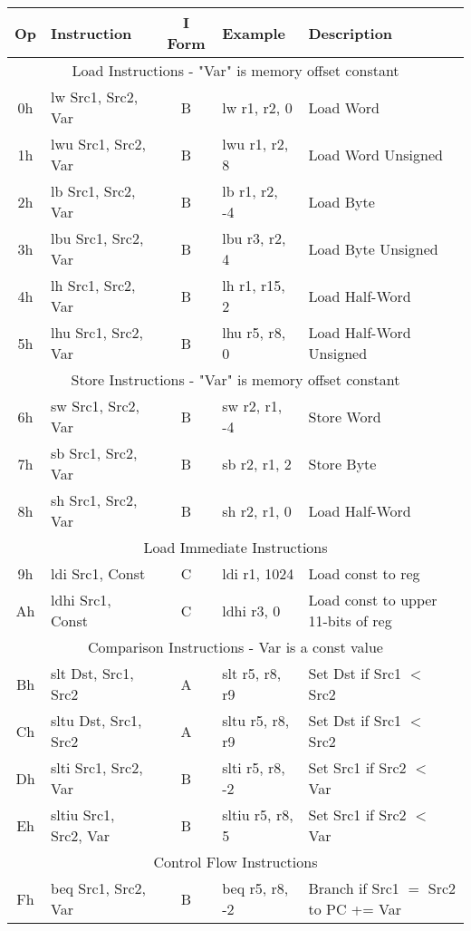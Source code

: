 \documentclass[]{article}
\begin{document}
\begin{longtable}{|c|l|c|l|l|}
	\hline
	Op & Instruction & I Form & Example & Description \\
	\hline
	\multicolumn{5}{|c|}{Load Instructions - "Var" is memory offset constant} \\
	\hline
	0h & lw Src1, Src2, Var & B & lw r1, r2, 0 & Load Word \\
	\hline
	1h & lwu Src1, Src2, Var & B & lwu r1, r2, 8 & Load Word Unsigned \\
	\hline
	2h & lb Src1, Src2, Var & B & lb r1, r2, -4 & Load Byte\\
	\hline
	3h & lbu Src1, Src2, Var & B & lbu r3, r2, 4 & Load Byte Unsigned \\
	\hline
	4h & lh Src1, Src2, Var & B & lh r1, r15, 2 & Load Half-Word \\
	\hline
	5h & lhu Src1, Src2, Var & B & lhu r5, r8, 0 & Load Half-Word Unsigned \\
	\hline
	\multicolumn{5}{|c|}{Store Instructions - "Var" is memory offset constant} \\
	\hline
	6h & sw Src1, Src2, Var & B & sw r2, r1, -4 & Store Word \\
	\hline
	7h & sb Src1, Src2, Var & B & sb r2, r1, 2 & Store Byte \\
	\hline
	8h & sh Src1, Src2, Var & B & sh r2, r1, 0 & Load Half-Word \\
	\hline
	\multicolumn{5}{|c|}{Load Immediate Instructions} \\
	\hline
	9h & ldi Src1, Const & C & ldi r1, 1024 & Load const to reg \\
	\hline
	Ah & ldhi Src1, Const & C & ldhi r3, 0 & Load const to upper 11-bits of reg \\
	\hline
	\multicolumn{5}{|c|}{Comparison Instructions - Var is a const value} \\
	\hline
	Bh & slt Dst, Src1, Src2 & A & slt r5, r8, r9 & Set Dst if Src1 $<$ Src2 \\
	\hline
	Ch & sltu Dst, Src1, Src2 & A & sltu r5, r8, r9 & Set Dst if Src1 $<$ Src2 \\
	\hline
	Dh & slti Src1, Src2, Var & B & slti r5, r8, -2 & Set Src1 if Src2 $<$ Var \\
	\hline
	Eh & sltiu Src1, Src2, Var & B & sltiu r5, r8, 5 & Set Src1 if Src2 $<$ Var \\
	\multicolumn{5}{|c|}{Control Flow Instructions} \\
	\hline
	Fh & beq Src1, Src2, Var & B & beq r5, r8, -2 & Branch if Src1 $=$ Src2 to PC += Var \\

\end{longtable}
\end{document}
